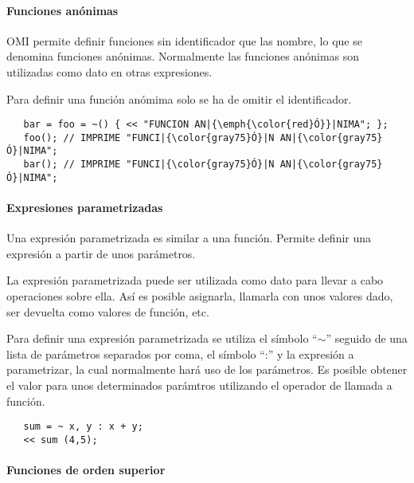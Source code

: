 \paragraph{Funciones anónimas}
OMI permite definir funciones sin identificador que las nombre, lo que se denomina funciones 
anónimas. Normalmente las funciones anónimas son utilizadas
como dato en otras expresiones. 

Para definir una función anómima solo se ha de omitir el identificador. \\


\begin{lstlisting} 
   bar = foo = ~() { << "FUNCION AN|{\emph{\color{red}Ó}}|NIMA"; };
   foo(); // IMPRIME "FUNCI|{\color{gray75}Ó}|N AN|{\color{gray75}Ó}|NIMA"; 
   bar(); // IMPRIME "FUNCI|{\color{gray75}Ó}|N AN|{\color{gray75}Ó}|NIMA"; 
\end{lstlisting}



\paragraph{Expresiones parametrizadas}

Una expresión parametrizada es similar a una función. Permite definir una expresión a partir de unos parámetros. 

La expresión parametrizada puede ser utilizada como dato para llevar a cabo operaciones sobre ella. Así es posible asignarla, 
llamarla con unos valores dado, ser devuelta como valores de función, etc.

Para definir una expresión parametrizada se utiliza el símbolo ``$\sim$'' seguido de una lista de parámetros separados por coma, el símbolo ``:'' y la expresión 
a parametrizar, la cual normalmente hará uso de los parámetros. Es posible obtener el valor para unos determinados parámtros utilizando 
el operador de llamada a función. \\

\begin{lstlisting} 
   sum = ~ x, y : x + y;
   << sum (4,5); 
\end{lstlisting}


\paragraph{Funciones de orden superior}

